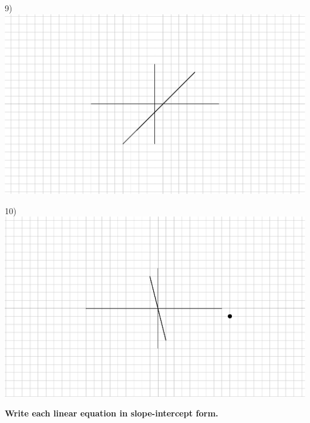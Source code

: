 \documentclass[11pt]{book}
\newcommand{\tmstrong}[1]{\textbf{#1}}
\theoremstyle{definition}  %
\begin{document}
\begin{multicols}{2}
  
  9)\\
	\includegraphics[scale=.7,bb = 115 65 310 190, clip=true]{II_1_4ap-2.eps}
  
  10)\\
	\includegraphics[scale=.7,bb = 115 65 310 190, clip=true]{II_1_4ap-3.eps}
  
  
  
\end{multicols}


{\tmstrong{Write each linear equation in slope-intercept form.}}
\end{document}
